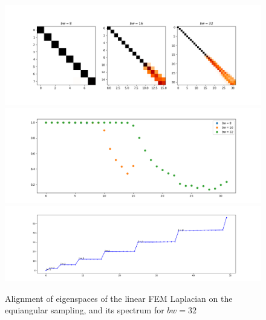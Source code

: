 \begin{figure}[h!]
	\centering
	\includegraphics[width=\linewidth]{../codes/03.FEM_laplacian/equiangular/normal/img/linearFEM.png}
	\includegraphics[width=\linewidth]{../codes/03.FEM_laplacian/equiangular/normal/img/linearFEM_diagonal.png}	
	\includegraphics[width=\linewidth]{../codes/03.FEM_laplacian/equiangular/normal/img/FEM_eigenvalues_16.png}	
	\caption{\label{fig:FEMequiangular}Alignment of eigenspaces of the linear FEM Laplacian on the equiangular sampling, and its spectrum for $bw=32$}
\end{figure}

\clearpage







